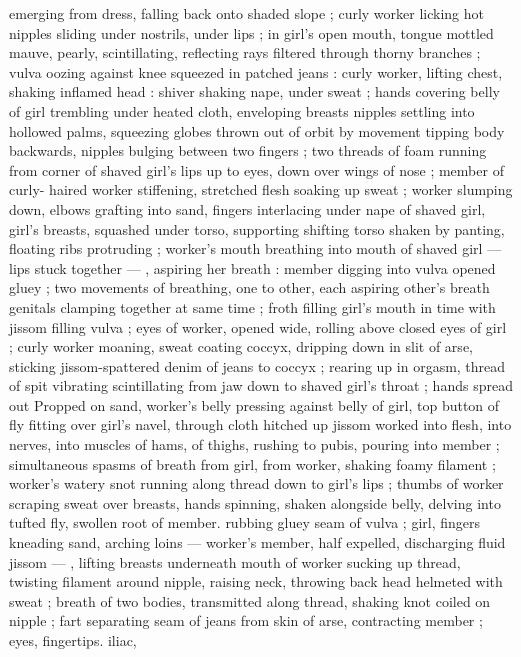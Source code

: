 emerging from dress, falling back onto shaded slope ; curly worker 
licking hot nipples sliding under nostrils, under lips ; in girl's open 
mouth, tongue mottled mauve, pearly, scintillating, reflecting rays 
filtered through thorny branches ; vulva oozing against knee 
squeezed in patched jeans : curly worker, lifting chest, shaking 
inflamed head : shiver shaking nape, under sweat ; hands covering 
belly of girl trembling under heated cloth, enveloping breasts 
nipples settling into hollowed palms, squeezing globes thrown out of 
orbit by movement tipping body backwards, nipples bulging between 
two fingers ; two threads of foam running from corner of shaved 
girl's lips up to eyes, down over wings of nose ; member of curly- 
haired worker stiffening, stretched flesh soaking up sweat ; worker 
slumping down, elbows grafting into sand, fingers interlacing under 
nape of shaved girl, girl's breasts, squashed under torso, supporting 
shifting torso shaken by panting, floating ribs protruding ; worker's 
mouth breathing into mouth of shaved girl --- lips stuck together --- 
, aspiring her breath : member digging into vulva opened gluey ; two 
movements of breathing, one to other, each aspiring other's breath 
genitals clamping together at same time ; froth filling girl's mouth in 
time with jissom filling vulva ; eyes of worker, opened wide, rolling 
above closed eyes of girl ; curly worker moaning, sweat coating 
coccyx, dripping down in slit of arse, sticking jissom-spattered denim 
of jeans to coccyx ; rearing up in orgasm, thread of spit vibrating 
scintillating from jaw down to shaved girl's throat ; hands spread out 
Propped on sand, worker's belly pressing against belly of girl, top 
button of fly fitting over girl's navel, through cloth hitched up 
jissom worked into flesh, into nerves, into muscles of hams, of 
thighs, rushing to pubis, pouring into member ; simultaneous spasms 
of breath from girl, from worker, shaking foamy filament ; worker's 
watery snot running along thread down to girl's lips ; thumbs of 
worker scraping sweat over breasts, hands spinning, shaken 
alongside belly, delving into tufted fly, swollen root of member. 
rubbing gluey seam of vulva ; girl, fingers kneading sand, arching 
loins --- worker's member, half expelled, discharging fluid jissom --- 
, lifting breasts underneath mouth of worker sucking up thread, 
twisting filament around nipple, raising neck, throwing back head 
helmeted with sweat ; breath of two bodies, transmitted along 
thread, shaking knot coiled on nipple ; fart separating seam of jeans 
from skin of arse, contracting member ; eyes, fingertips. iliac, 
